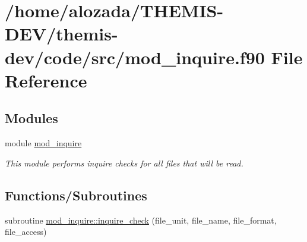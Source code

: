 \hypertarget{mod__inquire_8f90}{}\section{/home/alozada/\+T\+H\+E\+M\+I\+S-\/\+D\+E\+V/themis-\/dev/code/src/mod\+\_\+inquire.f90 File Reference}
\label{mod__inquire_8f90}
\subsection*{Modules}
\begin{DoxyCompactItemize}
\item 
module \hyperlink{namespacemod__inquire}{mod\+\_\+inquire}
\begin{DoxyCompactList}\small\item\em This module performs inquire checks for all files that will be read. \end{DoxyCompactList}\end{DoxyCompactItemize}
\subsection*{Functions/\+Subroutines}
\begin{DoxyCompactItemize}
\item 
subroutine \hyperlink{namespacemod__inquire_a404416015b424b2545d556f51ed67af8}{mod\+\_\+inquire\+::inquire\+\_\+check} (file\+\_\+unit, file\+\_\+name, file\+\_\+format, file\+\_\+access)
\end{DoxyCompactItemize}
